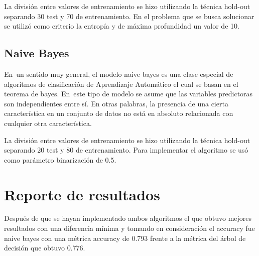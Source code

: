 \documentclass[12pt]{report}
\renewcommand{\_}{\kern-1.5pt\textunderscore\kern-1.5pt}
\begin{document}
\vspace{\baselineskip}
La división entre valores de entrenamiento se hizo utilizando la técnica hold-out separando 30 test y 70 de entrenamiento.
En el problema que se busca solucionar se utilizó como criterio la entropía y de máxima profundidad un valor de 10.
\subsection{Naive Bayes}
En\ un sentido muy general, el modelo naive bayes es una clase especial de algoritmos de clasificación de Aprendizaje Automático el cual  se basan en el teorema de bayes.
En\ este tipo de modelo se asume que las variables predictoras son independientes entre sí. En otras palabras,  la presencia de una cierta característica en un conjunto de datos no está en absoluto relacionada con cualquier otra característica.

\vspace{\baselineskip}
La división entre valores de entrenamiento se hizo utilizando la técnica hold-out separando 20 test y 80 de entrenamiento.
Para implementar el algoritmo se usó como parámetro binarización de 0.5.

\vspace{\baselineskip}

\vspace{\baselineskip}

\vspace{\baselineskip}

\vspace{\baselineskip}

\vspace{\baselineskip}

\vspace{\baselineskip}
{\fontsize{20pt}{24.0pt}\selectfont \textbf{ }}

\vspace{\baselineskip}
\section{Reporte de resultados}
Después de que se hayan implementado ambos algoritmos el que obtuvo mejores resultados con una diferencia mínima y tomando en consideración el accuracy fue naive bayes con una métrica accuracy de 0.793 frente a la métrica del árbol de decisión que obtuvo 0.776.

\vspace{\baselineskip}

\vspace{\baselineskip}
\end{document}
